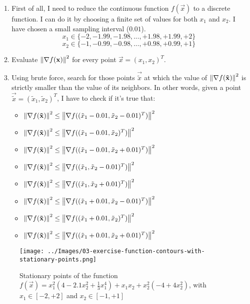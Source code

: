     \begin{enumerate}
        \item First of all, I need to reduce the continuous function \(f(\vec{x})\) to a discrete function. I can do it by choosing a finite set of values for both \(x_1\) and \(x_2\). I have chosen a small sampling interval (\(0.01\)).
            \[x_1 \in \{-2, -1.99, -1.98, ..., +1.98, +1.99, +2\}\]
            \[x_2 \in \{-1, -0.99, -0.98, ..., +0.98, +0.99, +1\}\]
        \item Evaluate \(\left\lVert\nabla f(\mathbf{x})\right\rVert^2\) for every point \(\vec{x} = (x_1, x_2)^T\).
        \item Using brute force, search for those points \(\vec{\tilde{x}}\) at which the value of \(\left\lVert\nabla f(\mathbf{\tilde{x}})\right\rVert^2\) is strictly smaller than the value of its neighbors. In other words, given a point \(\vec{\tilde{x}} = (\tilde{x}_1, \tilde{x}_2)^T\), I have to check if it's true that:
        \begin{itemize}
            \item \(\left\lVert\nabla f(\mathbf{\tilde{x}})\right\rVert^2 \le \left\lVert\nabla f((\tilde{x}_1-0.01, \tilde{x}_2-0.01)^T)\right\rVert^2\)
            \item \(\left\lVert\nabla f(\mathbf{\tilde{x}})\right\rVert^2 \le \left\lVert\nabla f((\tilde{x}_1-0.01, \tilde{x}_2)^T)\right\rVert^2\)
            \item \(\left\lVert\nabla f(\mathbf{\tilde{x}})\right\rVert^2 \le \left\lVert\nabla f((\tilde{x}_1-0.01, \tilde{x}_2+0.01)^T)\right\rVert^2\)
            \item \(\left\lVert\nabla f(\mathbf{\tilde{x}})\right\rVert^2 \le \left\lVert\nabla f((\tilde{x}_1, \tilde{x}_2-0.01)^T)\right\rVert^2\)
            \item \(\left\lVert\nabla f(\mathbf{\tilde{x}})\right\rVert^2 \le \left\lVert\nabla f((\tilde{x}_1, \tilde{x}_2+0.01)^T)\right\rVert^2\)
            \item \(\left\lVert\nabla f(\mathbf{\tilde{x}})\right\rVert^2 \le \left\lVert\nabla f((\tilde{x}_1+0.01, \tilde{x}_2-0.01)^T)\right\rVert^2\)
            \item \(\left\lVert\nabla f(\mathbf{\tilde{x}})\right\rVert^2 \le \left\lVert\nabla f((\tilde{x}_1+0.01, \tilde{x}_2)^T)\right\rVert^2\)
            \item \(\left\lVert\nabla f(\mathbf{\tilde{x}})\right\rVert^2 \le \left\lVert\nabla f((\tilde{x}_1+0.01, \tilde{x}_2+0.01)^T)\right\rVert^2\)
        \end{itemize}
    \end{enumerate}
    \begin{figure}
        \centering
        \texttt{[image: ../Images/03-exercise-function-contours-with-stationary-points.png]}
        \caption{Stationary points of the function \(f(\vec{x}) = x_1^2(4 - 2.1x_2^2 + \frac{1}{3}x_1^4) + x_1x_2 + x_2^2(-4 + 4x_2^2)\), with \(x_1 \in [-2, +2]\) and \(x_2 \in [-1, +1]\)}
        \label{exercise-function-contours-with-stationary-points}
    \end{figure}
